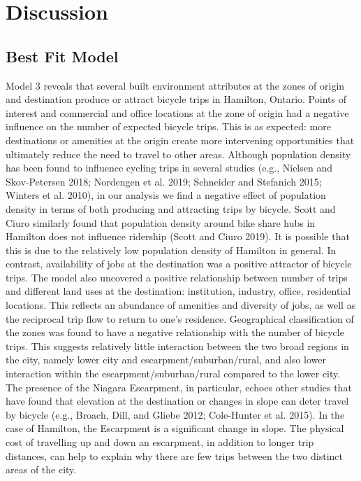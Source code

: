 \documentclass[smallextended]{svjour3}       %
\begin{document}
\hypertarget{sec:discussion}{%
\section{Discussion}\label{sec:discussion}}

\hypertarget{best-fit-model}{%
\subsection{Best Fit Model}\label{best-fit-model}}

Model 3 reveals that several built environment attributes at the zones
of origin and destination produce or attract bicycle trips in Hamilton,
Ontario. Points of interest and commercial and office locations at the
zone of origin had a negative influence on the number of expected
bicycle trips. This is as expected: more destinations or amenities at
the origin create more intervening opportunities that ultimately reduce
the need to travel to other areas. Although population density has been
found to influence cycling trips in several studies (e.g., Nielsen and
Skov-Petersen 2018; Nordengen et al. 2019; Schneider and Stefanich 2015;
Winters et al. 2010), in our analysis we find a negative effect of
population density in terms of both producing and attracting trips by
bicycle. Scott and Ciuro similarly found that population density around
bike share hubs in Hamilton does not influence ridership (Scott and
Ciuro 2019). It is possible that this is due to the relatively low
population density of Hamilton in general. In contrast, availability of
jobs at the destination was a positive attractor of bicycle trips. The
model also uncovered a positive relationship between number of trips and
different land uses at the destination: institution, industry, office,
residential locations. This reflects an abundance of amenities and
diversity of jobs, as well as the reciprocal trip flow to return to
one's residence. Geographical classification of the zones was found to
have a negative relationship with the number of bicycle trips. This
suggests relatively little interaction between the two broad regions in
the city, namely lower city and escarpment/suburban/rural, and also
lower interaction within the escarpment/suburban/rural compared to the
lower city. The presence of the Niagara Escarpment, in particular,
echoes other studies that have found that elevation at the destination
or changes in slope can deter travel by bicycle (e.g., Broach, Dill, and
Gliebe 2012; Cole-Hunter et al. 2015). In the case of Hamilton, the
Escarpment is a significant change in slope. The physical cost of
travelling up and down an escarpment, in addition to longer trip
distances, can help to explain why there are few trips between the two
distinct areas of the city.
\end{document}
